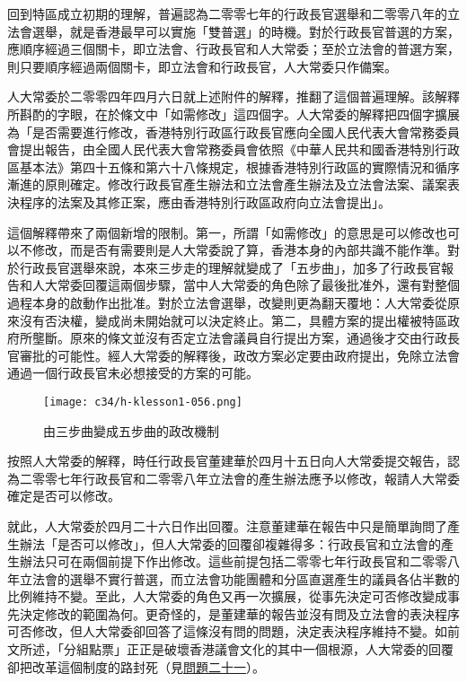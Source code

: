 回到特區成立初期的理解，普遍認為二零零七年的行政長官選舉和二零零八年的立法會選舉，就是香港最早可以實施「雙普選」的時機。對於行政長官普選的方案，應順序經過三個關卡，即立法會、行政長官和人大常委；至於立法會的普選方案，則只要順序經過兩個關卡，即立法會和行政長官，人大常委只作備案。

人大常委於二零零四年四月六日就上述附件的解釋，推翻了這個普遍理解。該解釋所斟酌的字眼，在於條文中「如需修改」這四個字。人大常委的解釋把四個字擴展為「是否需要進行修改，香港特別行政區行政長官應向全國人民代表大會常務委員會提出報告，由全國人民代表大會常務委員會依照《中華人民共和國香港特別行政區基本法》第四十五條和第六十八條規定，根據香港特別行政區的實際情況和循序漸進的原則確定。修改行政長官產生辦法和立法會產生辦法及立法會法案、議案表決程序的法案及其修正案，應由香港特別行政區政府向立法會提出」。

這個解釋帶來了兩個新增的限制。第一，所謂「如需修改」的意思是可以修改也可以不修改，而是否有需要則是人大常委說了算，香港本身的內部共識不能作準。對於行政長官選舉來說，本來三步走的理解就變成了「五步曲」，加多了行政長官報告和人大常委回覆這兩個步驟，當中人大常委的角色除了最後批准外，還有對整個過程本身的啟動作出批准。對於立法會選舉，改變則更為翻天覆地：人大常委從原來沒有否決權，變成尚未開始就可以決定終止。第二，具體方案的提出權被特區政府所壟斷。原來的條文並沒有否定立法會議員自行提出方案，通過後才交由行政長官審批的可能性。經人大常委的解釋後，政改方案必定要由政府提出，免除立法會通過一個行政長官未必想接受的方案的可能。

\begin{figure}[htbp]
    \centering
    \texttt{[image: c34/h-klesson1-056.png]}
    \caption{由三步曲變成五步曲的政改機制} 
\end{figure}

按照人大常委的解釋，時任行政長官董建華於四月十五日向人大常委提交報告，認為二零零七年行政長官和二零零八年立法會的產生辦法應予以修改，報請人大常委確定是否可以修改。

就此，人大常委於四月二十六日作出回覆。注意董建華在報告中只是簡單詢問了產生辦法「是否可以修改」，但人大常委的回覆卻複雜得多：行政長官和立法會的產生辦法只可在兩個前提下作出修改。這些前提包括二零零七年行政長官和二零零八年立法會的選舉不實行普選，而立法會功能團體和分區直選產生的議員各佔半數的比例維持不變。至此，人大常委的角色又再一次擴展，從事先決定可否修改變成事先決定修改的範圍為何。更奇怪的，是董建華的報告並沒有問及立法會的表決程序可否修改，但人大常委卻回答了這條沒有問的問題，決定表決程序維持不變。如前文所述，「分組點票」正正是破壞香港議會文化的其中一個根源，人大常委的回覆卻把改革這個制度的路封死（見\hyperref[sec:sec21]{問題二十一}）。

